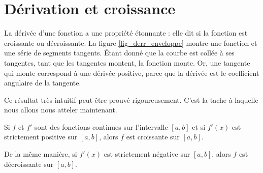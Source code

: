 					\section{Dérivation et croissance}

La dérivée d'une fonction a une propriété étonnante : elle dit si la fonction est croissante ou décroissante. La figure \ref{fig_derr_enveloppe} montre une fonction et une série de segments tangents. Étant donné que la courbe est \og collée \fg{} à ses tangentes, tant que les tangentes montent, la fonction monte. Or, une tangente qui monte correspond à une dérivée positive, parce que la dérivée est le coefficient angulaire de la tangente.

\newcommand{\CaptionDerrEnveloppe}{Quelque tangentes à la fonction $x\mapsto x^2/3$. Comme tu le vois, la fonction est \og collée\fg{} à ses tangentes.}


Ce résultat très intuitif peut être prouvé rigoureusement. C'est la tache à laquelle nous allons nous atteler maintenant.

\begin{proposition}
	Si $f$ et $f'$ sont des fonctions continues sur l'intervalle $[a,b]$ et si $f'(x)$ est strictement positive sur $[a,b]$, alors $f$ est croissante sur $[a,b]$.

	De la même manière, si $f'(x)$ est strictement négative sur $[a,b]$, alors $f$ est décroissante sur $[a,b]$.
\end{proposition}

